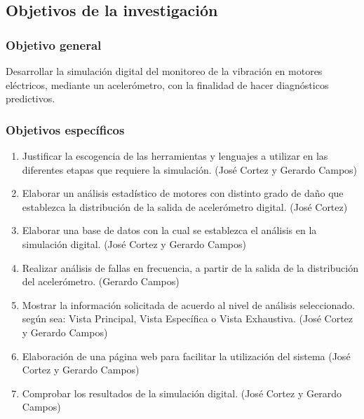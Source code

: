 \subsection{Objetivos de la investigación}

\subsubsection{Objetivo general}
	Desarrollar la simulación digital del monitoreo de la vibración en motores eléctricos, mediante un acelerómetro, con la finalidad de hacer diagnósticos predictivos.

	
\subsubsection{Objetivos específicos}

	\begin{enumerate}
		\item Justificar la escogencia de las herramientas y lenguajes a utilizar en las diferentes etapas que requiere la simulación. (José Cortez y Gerardo Campos)

		\item Elaborar un análisis estadístico de motores con distinto grado de daño que establezca la distribución de la salida de acelerómetro digital. (José Cortez)

		\item Elaborar una base de datos con la cual se establezca el análisis en la simulación digital. (José Cortez y Gerardo Campos) 
		
		\item Realizar análisis de fallas en frecuencia, a partir de la salida de la distribución del acelerómetro. (Gerardo Campos)

		\item Mostrar la información solicitada de acuerdo al nivel de análisis seleccionado. según sea: Vista Principal, Vista Específica o Vista Exhaustiva. (José Cortez y Gerardo Campos)

		\item Elaboración de una página web para facilitar la utilización del sistema (José Cortez y Gerardo Campos)

		\item Comprobar los resultados de la simulación digital. (José Cortez y Gerardo Campos)
	\end{enumerate}
